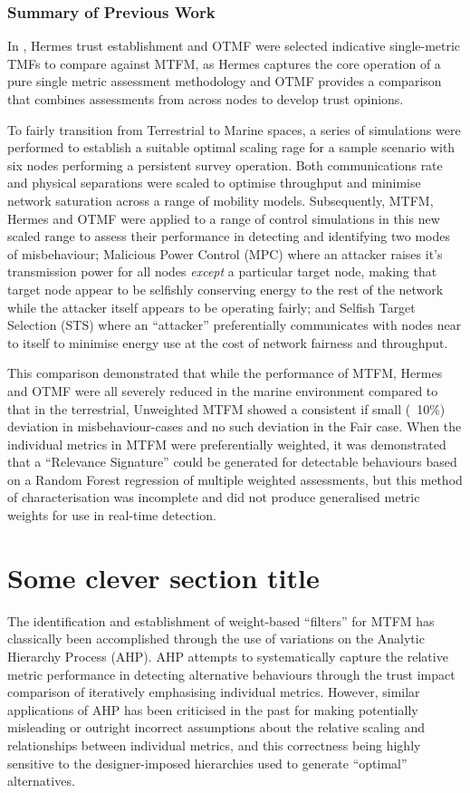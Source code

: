 \documentclass[conference]{IEEEtran}
\begin{document}
\subsubsection{Summary of Previous Work}
In \cite{Bolster2015}, Hermes trust establishment and OTMF were selected indicative single-metric TMFs to compare against MTFM, as Hermes captures the core operation of a pure single metric assessment methodology and OTMF provides a comparison that combines assessments from across nodes to develop trust opinions.

To fairly transition from Terrestrial to Marine spaces, a series of simulations were performed to establish a suitable optimal scaling rage for a sample scenario with six nodes performing a persistent survey operation. 
Both communications rate and physical separations were scaled to optimise throughput and minimise network saturation across a range of mobility models.
Subsequently, MTFM, Hermes and OTMF were applied to a range of control simulations in this new scaled range to assess their performance in detecting and identifying two modes of misbehaviour; Malicious Power Control (MPC) where an attacker raises it's transmission power for all nodes \emph{except} a particular target node, making that target node appear to be selfishly conserving energy to the rest of the network while the attacker itself appears to be operating fairly; and Selfish Target Selection (STS) where an ``attacker'' preferentially communicates with nodes near to itself to minimise energy use at the cost of network fairness and throughput.

This comparison demonstrated that while the performance of MTFM, Hermes and OTMF were all severely reduced in the marine environment compared to that in the terrestrial, Unweighted MTFM showed a consistent if small (~10\%) deviation in misbehaviour-cases and no such deviation in the Fair case.
When the individual metrics in MTFM were preferentially weighted, it was demonstrated that a ``Relevance Signature'' could be generated for detectable behaviours based on a Random Forest regression of multiple weighted assessments, but this method of characterisation was incomplete and did not produce generalised metric weights for use in real-time detection.

\section{Some clever section title}

The identification and establishment of weight-based ``filters'' for MTFM has classically been accomplished through the use of variations on 
the Analytic Hierarchy Process (AHP)\cite{Saaty2008}.
AHP attempts to systematically capture the relative metric performance in detecting alternative behaviours through the trust impact comparison of iteratively emphasising individual metrics.
However, similar applications of AHP has been criticised in the past \cite{Whitaker2007} for making potentially misleading or outright incorrect assumptions about the relative scaling and relationships between individual metrics, and this correctness being highly sensitive to the designer-imposed hierarchies used to generate ``optimal'' alternatives.
\end{document}
